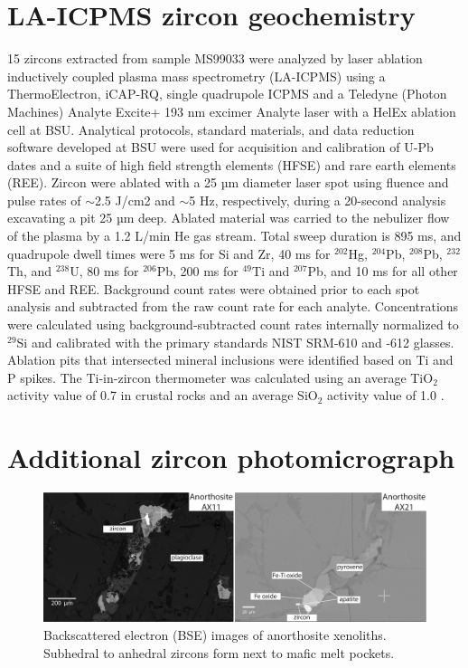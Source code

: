 \section*{LA-ICPMS zircon geochemistry}

15 zircons extracted from sample MS99033 were analyzed by laser ablation inductively coupled plasma mass spectrometry (LA-ICPMS) using a ThermoElectron, iCAP-RQ, single quadrupole ICPMS and a Teledyne (Photon Machines) Analyte Excite+ 193 nm excimer Analyte laser with a HelEx ablation cell at BSU. Analytical protocols, standard materials, and data reduction software developed at BSU were used for acquisition and calibration of U-Pb dates and a suite of high field strength elements (HFSE) and rare earth elements (REE). Zircon were ablated with a 25 µm diameter laser spot using fluence and pulse rates of $\sim$2.5 J/cm2 and $\sim$5 Hz, respectively, during a 20-second analysis excavating a pit 25 µm deep. Ablated material was carried to the nebulizer flow of the plasma by a 1.2 L/min He gas stream. Total sweep duration is 895 ms, and quadrupole dwell times were 5 ms for Si and Zr, 40 ms for $^{202}$Hg, $^{204}$Pb, $^{208}$Pb, $^{232}$Th, and $^{238}$U, 80 ms for $^{206}$Pb, 200 ms for $^{49}$Ti and $^{207}$Pb, and 10 ms for all other HFSE and REE. Background count rates were obtained prior to each spot analysis and subtracted from the raw count rate for each analyte. Concentrations were calculated using background-subtracted count rates internally normalized to $^{29}$Si and calibrated with the primary standards NIST SRM-610 and -612 glasses. Ablation pits that intersected mineral inclusions were identified based on Ti and P spikes. The Ti-in-zircon thermometer was calculated using an average TiO$_2$ activity value of 0.7 in crustal rocks \citep{Watson2006a} and an average SiO$_2$ activity value of 1.0 \citep{Ferry2007a}. 

\section*{Additional zircon photomicrograph}
\begin{figure}[h!]
\noindent\includegraphics[width=\textwidth]{figure/Zhang2021/SI_interstitial_zircons.pdf}
\caption[Backscattered electron (BSE) images of anorthosite xenoliths.]{\footnotesize{Backscattered electron (BSE) images of anorthosite xenoliths. Subhedral to anhedral zircons form next to mafic melt pockets.}}
\label{fig:interstitial_zircons}
\end{figure}


